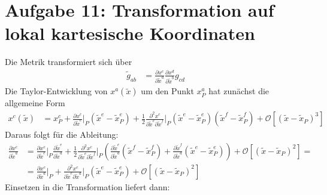 \documentclass[a4paper,12pt]{article}
\newcommand{\kla}{}
\newcommand{\klam}{}
\begin{document}
\section*{Aufgabe 11: Transformation auf lokal kartesische Koordinaten}
Die Metrik transformiert sich über
\begin{align*}
\tilde{g}_{ab}&=\frac{\partial x^c}{\partial\tilde{x}^a}\frac{\partial x^d}{\partial\tilde{x}^b}g_{cd}
\end{align*}
Die Taylor-Entwicklung von $x^a(\tilde{x})$ um den Punkt $x_P^a$ hat zunächst die allgemeine Form
\begin{align*}
x^c(\tilde{x})&=x^c_P+\frac{\partial x^c}{\partial\tilde{x}^e}\Big\vert_P(\tilde{x}^e-\tilde{x}^e_P)+\frac{1}{2}\frac{\partial^2x^c}{\partial\tilde{x}^e\partial\tilde{x}^f}\Big\vert_P(\tilde{x}^e-\tilde{x}^e_P)(\tilde{x}^f-\tilde{x}^f_P)+\mathcal{O}\klam\left[ {(\tilde{x}-\tilde{x}_P)^3} \right]
\end{align*}
Daraus folgt für die Ableitung:
\begin{align*}
\frac{\partial x^c}{\partial\tilde{x}^a}&=\frac{\partial x^c}{\partial\tilde{x}^e}\Big\vert_P\frac{\partial \tilde{x}^e}{\partial\tilde{x}^a}+\frac{1}{2}\frac{\partial^2x^c}{\partial\tilde{x}^e\partial\tilde{x}^f}\Big\vert_P\kla\left( {\frac{\partial \tilde{x}^e}{\partial\tilde{x}^a}(\tilde{x}^f-\tilde{x}^f_P)+\frac{\partial \tilde{x}^f}{\partial\tilde{x}^a}(\tilde{x}^e-\tilde{x}^e_P)} \right)+\mathcal{O}\klam\left[ {(\tilde{x}-\tilde{x}_P)^2} \right]=\\
&=\frac{\partial x^c}{\partial\tilde{x}^a}\Big\vert_P+\frac{\partial^2x^c}{\partial\tilde{x}^e\partial\tilde{x}^a}\Big\vert_P(\tilde{x}^e-\tilde{x}^e_P)+\mathcal{O}\klam\left[ {(\tilde{x}-\tilde{x}_P)^2} \right]
\end{align*}
Einsetzen in die Transformation liefert dann:
\end{document}
